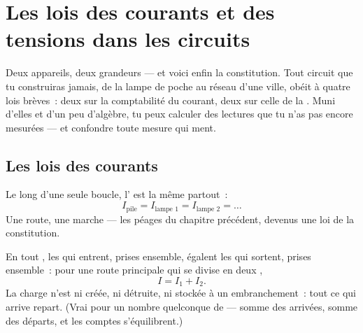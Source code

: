 \chapter{Les lois des courants et des tensions dans les circuits}\label{ch:g8:circuit-laws}

Deux appareils, deux grandeurs --- et voici enfin la constitution.
Tout circuit que tu construiras jamais, de la lampe de poche au réseau
d'une ville, obéit à quatre lois brèves~: deux sur la comptabilité du
courant, deux sur celle de la . Muni d'elles et d'un peu
d'algèbre, tu peux calculer des lectures que tu n'as pas encore
mesurées --- et confondre toute mesure qui ment.

\section{Les lois des courants}

\begin{proposition}\label{prop:g8:circuit-laws:seriesI}
Le long d'une seule boucle, l' est la même partout~:
\[
I_{\text{pile}} = I_{\text{lampe 1}} = I_{\text{lampe 2}} =
\dots
\]
Une route, une marche --- les péages du chapitre précédent, devenus
une loi de la constitution.
\end{proposition}

\begin{proposition}\label{prop:g8:circuit-laws:junction}
En tout , les  qui entrent, prises ensemble, égalent
les  qui sortent, prises ensemble~: pour une route
principale qui se divise en deux ,
\[
I = I_1 + I_2 .
\]
La charge n'est ni créée, ni détruite, ni stockée à un
embranchement~: tout ce qui arrive repart. (Vrai pour un nombre
quelconque de  --- somme des arrivées, somme des départs, et
les comptes s'équilibrent.)
\end{proposition}

